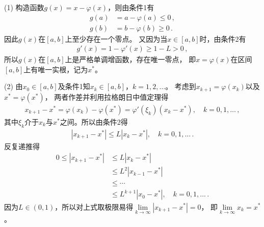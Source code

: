 \begin{prove}
    (1) 构造函数$g(x)=x-\varphi(x)$，则由条件1有
    \begin{align}\label{eq:02ex0312}
        g(a) & =a-\varphi(a)\le0\, , \\
        g(b) & =b-\varphi(b)\ge0\, .
    \end{align}
    因此$g(x)$在$[a,b]$上至少存在一个零点。
    又因为当$x\in[a,b]$时，由条件2有
    \begin{align}\label{eq:02ex0313}
        g'(x)=1-\varphi'(x)\ge1-L>0\, ,
    \end{align}
    所以$g(x)$在$[a,b]$上是严格单调增函数，存在唯一零点，
    即$x=\varphi(x)$在区间$[a,b]$上有唯一实根，记为$x^*$。

    (2) 由$x_0\in[a,b]$及条件1知$x_k\in[a,b]$，$k=1,2,\ldots$。
    考虑到$x_{k+1}=\varphi(x_k)$以及$x^*=\varphi(x^*)$，
    两者作差并利用拉格朗日中值定理得
    \begin{align}\label{eq:02ex0314}
        x_{k+1}-x^*=\varphi(x_k)-\varphi(x^*)=\varphi'(\xi_k)(x_k-x^*),\quad k=0,1,\ldots\, ,
    \end{align}
    其中$\xi_k$介于$x_k$与$x^*$之间。所以由条件2得
    \begin{align}\label{eq:02ex0314.5}
        |x_{k+1}-x^*|\le L|x_k-x^*|,\quad k=0,1,\ldots\, .
    \end{align}
    反复递推得
    \begin{align}\label{eq:02ex0315}
        0\le|x_{k+1}-x^*| & \le L|x_k-x^*|\nonumber                     \\
                          & \le L^2|x_{k-1}-x^*|\nonumber               \\
                          & \le\cdots\nonumber                          \\
                          & \le L^{k+1}|x_0-x^*|,\quad k=0,1,\ldots\, .
    \end{align}
    因为$L\in(0,1)$，所以对上式取极限易得$\displaystyle\lim\limits_{k\rightarrow\infty}{|x_{k+1}-x^*|}=0$，
    即$\displaystyle\lim\limits_{k\rightarrow\infty}{x_k}=x^*$。


\end{prove}
